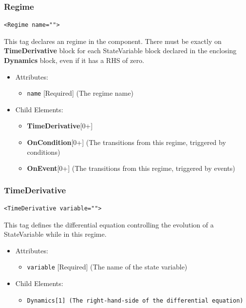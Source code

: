 \documentclass{article}
\newcommand{\Dynamics}{{\bf{Dynamics}}\xspace}
\newcommand{\MathInline}{\tt{Dynamics}}
\newcommand{\TimeDerivative}{{\bf{TimeDerivative}}\xspace}
\newcommand{\OnEvent}{{\bf{OnEvent}}\xspace}
\newcommand{\OnCondition}{{\bf{OnCondition}}\xspace}
\begin{document}
\subsubsection{Regime}
%
\begin{lstlisting}
<Regime name="">
\end{lstlisting}

This tag declares an regime in the component. There must be exactly on
\TimeDerivative block for each StateVariable block declared in the
enclosing \Dynamics block, even if it has a RHS of zero.

\begin{itemize}
\item Attributes:
\begin{itemize}
\item \verb|name| {[}Required{]} (The regime name)
\end{itemize}

\item Child Elements:
\begin{itemize}
\item \TimeDerivative {[}0+{]}
\item \OnCondition {[}0+{]} (The transitions from this regime, triggered by conditions)
\item \OnEvent {[}0+{]} (The transitions from this regime, triggered by events)
\end{itemize}

\end{itemize}

\subsubsection{TimeDerivative}
%
\begin{lstlisting}
<TimeDerivative variable="">
\end{lstlisting}

This tag defines the differential equation controlling the evolution of a StateVariable while
in this regime.

\begin{itemize}
\item Attributes:
%
\begin{itemize}
\item \verb|variable| {[}Required{]} (The name of the state variable)
\end{itemize}

\item Child Elements:
%
\begin{itemize}
\item \MathInline {[}1{]} (The right-hand-side of the differential equation)
\end{itemize}
\end{itemize}
\end{document}
